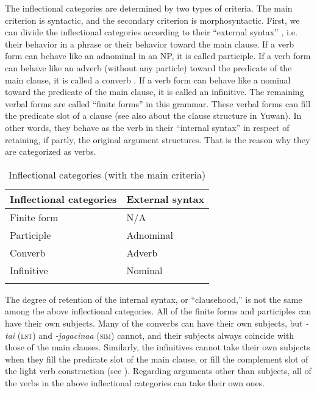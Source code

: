   The inflectional categories are determined by two types of criteria. The main criterion is syntactic, and the secondary criterion is morphosyntactic. First, we can divide the inflectional categories according to their “external syntax” \citep{Haspelmath1996}, i.e. their behavior in a phrase or their behavior toward the main clause. If a verb form can behave like an adnominal in an NP, it is called participle. If a verb form can behave like an adverb (without any particle) toward the predicate of the main clause, it is called a converb \citep{Haspelmath1995}. If a verb form can behave like a nominal toward the predicate of the main clause, it is called an infinitive. The remaining verbal forms are called “finite forms” in this grammar. These verbal forms can fill the predicate slot of a clause (see also  about the clause structure in Yuwan). In other words, they behave as the verb in their “internal syntax” \citep{Haspelmath1996} in respect of retaining, if partly, the original argument structures. That is the reason why they are categorized as verbs.

\begin{table}
\caption{\label{tab:key:77}Inflectional categories (with the main criteria)}
\begin{tabular}{ll}
  \lsptoprule
Inflectional categories&  External syntax                       \\
\midrule
Finite form            &    N/A                                \\
Participle             &  Adnominal                           \\
Converb                &Adverb                                 \\
Infinitive             &        Nominal                      \\
\lspbottomrule
\end{tabular}
\end{table}

The degree of retention of the internal syntax, or “clausehood,” is not the same among the above inflectional categories. All of the finite forms and participles can have their own subjects. Many of the converbs can have their own subjects, but \textit{-tai} (\textsc{lst}) and \textit{-jagacinaa} (\textsc{sim}) cannot, and their subjects always coincide with those of the main clauses. Similarly, the infinitives cannot take their own subjects when they fill the predicate slot of the main clause, or fill the complement slot of the light verb construction (see ). Regarding arguments other than subjects, all of the verbs in the above inflectional categories can take their own ones.

